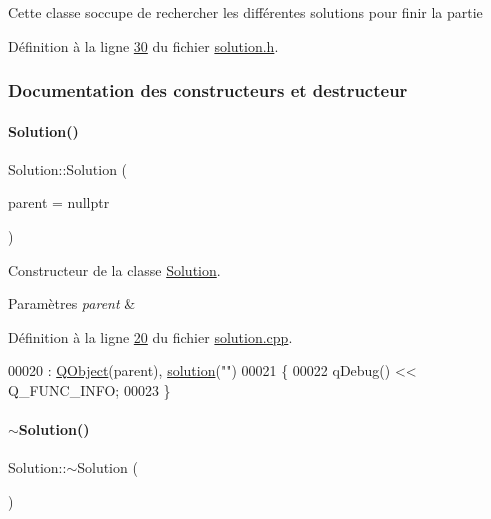 Cette classe s\textquotesingle{}occupe de rechercher les différentes solutions pour finir la partie 

Définition à la ligne \hyperlink{solution_8h_source_l00030}{30} du fichier \hyperlink{solution_8h_source}{solution.\+h}.



\subsubsection{Documentation des constructeurs et destructeur}
\mbox{\label{class_solution_a378d4a570c95a6d4c013996fef75c6f0}} 
\paragraph{\texorpdfstring{Solution()}{Solution()}}
{\footnotesize\ttfamily Solution\+::\+Solution (\begin{DoxyParamCaption}\item[{\hyperlink{class_q_object}{Q\+Object} $\ast$}]{parent = {\ttfamily nullptr} }\end{DoxyParamCaption})\hspace{0.3cm}{\ttfamily [explicit]}}



Constructeur de la classe \hyperlink{class_solution}{Solution}. 


\begin{DoxyParams}{Paramètres}
{\em parent} & \\
\hline
\end{DoxyParams}


Définition à la ligne \hyperlink{solution_8cpp_source_l00020}{20} du fichier \hyperlink{solution_8cpp_source}{solution.\+cpp}.


\begin{DoxyCode}
00020                                   : \hyperlink{class_q_object}{QObject}(parent), \hyperlink{class_solution_a03b47dedfe8a8f8244f7e633cbaa30fb}{solution}(\textcolor{stringliteral}{""})
00021 \{
00022    qDebug() << Q\_FUNC\_INFO;
00023 \}
\end{DoxyCode}
\mbox{\label{class_solution_a5d245f7409aacf6ace5e965b7879a580}} 
\paragraph{\texorpdfstring{$\sim$\+Solution()}{~Solution()}}
{\footnotesize\ttfamily Solution\+::$\sim$\+Solution (\begin{DoxyParamCaption}{ }\end{DoxyParamCaption})}



